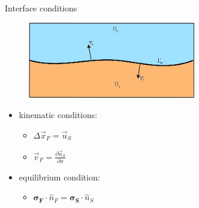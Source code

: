 \documentclass[10pt,t]{beamer}
\begin{document}
\begin{frame}{Interface conditions}
\label{interface}
    \begin{figure}[htbp!]
	\centering
	\includegraphics[width=0.65\textwidth]{images/interface}
\end{figure}

\begin{itemize}
    \item \textcolor{dorange}{kinematic conditions}:
    \begin{itemize}
        \item $\Delta \vec{x}_F = \vec{u}_S$
        \item $\vec{v}_F = \frac{\partial \vec{u}_S}{\partial x}$ 
    \end{itemize}
    \item \textcolor{dblue}{equilibrium condition}:
    \begin{itemize}
        \item $\bm{\sigma_F} \cdot \hat{n}_F = \bm{\sigma_S} \cdot \hat{n}_S$
    \end{itemize}
    \end{itemize}


\end{frame}
\end{document}
